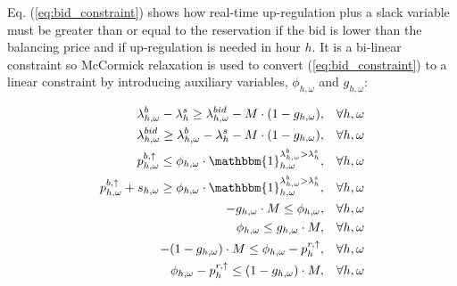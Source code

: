 Eq. (\ref{eq:bid_constraint}) shows how real-time up-regulation plus a slack variable must be greater than or equal to the reservation if the bid is lower than the balancing price and if up-regulation is needed in hour $h$. It is a bi-linear constraint so McCormick relaxation \cite{mccormick1976computability} is used to convert (\ref{eq:bid_constraint}) to a linear constraint by introducing auxiliary variables, $\phi_{h,\omega}$ and $g_{h,\omega}$:

\begin{subequations}\label{eq:bid_constraint_relaxed}
    \begin{align}
        \lambda_{h,\omega}^{b} - \lambda_{h}^{s} \geq \lambda_{h,\omega}^{bid} - M \cdot (1 - g_{h,\omega}) , \quad                                   & \forall{h,\omega}             \label{con_bid:subeq1} \\
        \lambda_{h,\omega}^{bid} \geq \lambda_{h,\omega}^{b} - \lambda_{h}^{s} - M \cdot (1 - g_{h,\omega}) , \quad                                   & \forall{h,\omega}             \label{con_bid:subeq2} \\
        p^{b, \uparrow}_{h,\omega} \leq \phi_{h,\omega} \cdot \mathbbm{1}_{h,\omega}^{\lambda^{b}_{h,\omega} > \lambda^{s}_{h}}, \quad                & \forall{{h,\omega}}           \label{con_bid:subeq3} \\
        p^{b, \uparrow}_{h,\omega} + s_{h,\omega} \geq \phi_{h,\omega} \cdot \mathbbm{1}_{h,\omega}^{\lambda^{b}_{h,\omega} > \lambda^{s}_{h}}, \quad & \forall{{h,\omega}}           \label{con_bid:subeq4} \\
        -g_{h,\omega} \cdot M \leq \phi_{h,\omega}, \quad                                                                                             & \forall{h,\omega}             \label{con_bid:subeq5} \\
        \phi_{h,\omega} \leq g_{h,\omega} \cdot M, \quad                                                                                              & \forall{h,\omega}             \label{con_bid:subeq6} \\
        -(1 - g_{h,\omega}) \cdot M \leq \phi_{h,\omega} - p^{r,\uparrow}_{h}, \quad                                                                  & \forall{h,\omega}             \label{con_bid:subeq7} \\
        \phi_{h,\omega} - p^{r,\uparrow}_{h} \leq (1 - g_{h,\omega}) \cdot M, \quad                                                                   & \forall{h,\omega}             \label{con_bid:subeq8}
    \end{align}
\end{subequations}

